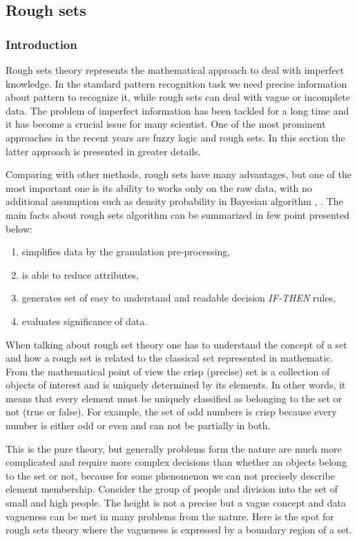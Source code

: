 \subsection{Rough sets}
\label{cha:Rough_set}
\subsubsection{Introduction}
\label{cha:Rough_set_introduction}
Rough sets theory represents the mathematical approach to deal with imperfect knowledge. 
In the standard pattern recognition task we need precise information about
pattern to recognize it, while rough sets can deal with vague or incomplete data. The problem of imperfect 
information has been tackled for a long time and it has become a crucial issue for many scientist.
One of the most prominent approaches in the recent years are fuzzy logic and rough sets.
In this section the latter approach is presented in greater details. 

Comparing with other methods, rough sets have many advantages, but one of the most important
one is its ability to works only on the raw data, with no additional assumption such 
as density probability in Bayesian algorithm \cite{bib38}, \cite{bib14}. The main facts about rough sets
algorithm can be summarized in few point presented below:
\begin{enumerate}
    \item simplifies data by the granulation pre-processing,
    \item is able to reduce attributes,
    \item generates set of easy to understand and readable decision
        \textit{IF-THEN} rules,
    \item evaluates significance of data.
\end{enumerate}

When talking about rough set theory one has to understand the concept of a set 
and how a rough set is related to the classical set represented in mathematic.
From the mathematical point of view the crisp (precise) set is a collection of 
objects of interest and is uniquely determined by its elements. In other words,
it means that every element must be uniquely classified as belonging to the set 
or not (true or false). For example, the set of odd numbers is crisp because every
number is either odd or even and can not be partially in both. 

This is the pure theory, but generally problems form the nature are much more
complicated and require more complex decisions than whether an objects belong to
the set or not, because for some phenomenon we can not precisely describe element
membership. Consider the group of people and division into the set of small and
high people. The height is not a precise but a vague concept and data vagueness can 
be met in many problems from the nature. Here is the spot for rough sets
theory where the vagueness is expressed by a boundary region of a set. 

